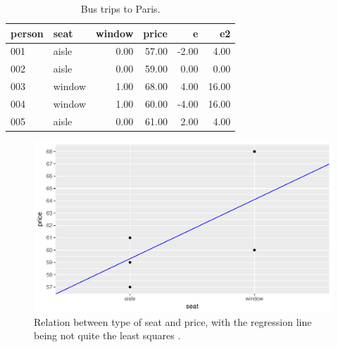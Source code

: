 \documentclass[]{report}\usepackage[]{graphicx}\usepackage[]{color}
\makeatletter
\def\maxwidth{ %
  \ifdim\Gin@nat@width>\linewidth
    \linewidth
  \else
    \Gin@nat@width
  \fi
}
\newenvironment{knitrout}{}{} %
\makeatother
\begin{document}
\begin{table}[ht]
\centering
\caption{Bus trips to Paris.} 
\label{tab:dummy_5}
\begin{tabular}{llrrrr}
  \hline
person & seat & window & price & e & e2 \\ 
  \hline
001 & aisle & 0.00 & 57.00 & -2.00 & 4.00 \\ 
  002 & aisle & 0.00 & 59.00 & 0.00 & 0.00 \\ 
  003 & window & 1.00 & 68.00 & 4.00 & 16.00 \\ 
  004 & window & 1.00 & 60.00 & -4.00 & 16.00 \\ 
  005 & aisle & 0.00 & 61.00 & 2.00 & 4.00 \\ 
   \hline
\end{tabular}
\end{table}




\begin{knitrout}
\color{fgcolor}\begin{figure}

{\centering \includegraphics[width=\maxwidth]{figure/dummy_6-1} 

}

\caption[Relation between type of seat and price, with the regression line being not quite the least squares ]{Relation between type of seat and price, with the regression line being not quite the least squares .}\label{fig:dummy_6}
\end{figure}


\end{knitrout}
\end{document}

